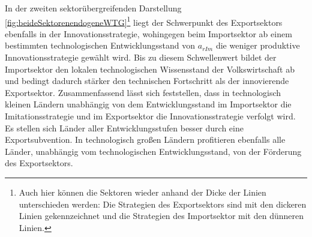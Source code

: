 In der zweiten sektorübergreifenden Darstellung \ref{fig:beideSektorenendogeneWTG}\footnote{Auch hier können die Sektoren wieder anhand der Dicke der Linien unterschieden werden: Die Strategien des Exportsektors sind mit den dickeren Linien gekennzeichnet und die Strategien des Importsektor mit den dünneren Linien.} liegt der Schwerpunkt des Exportsektors ebenfalls in der Innovationsstrategie, wohingegen beim Importsektor ab einem bestimmten technologischen Entwicklungsstand von $a_{rIm}$ die weniger produktive Innovationsstrategie gewählt wird. Bis zu diesem Schwellenwert bildet der Importsektor den lokalen technologischen Wissensstand der Volkswirtschaft ab und bedingt dadurch stärker den technischen Fortschritt als der innovierende Exportsektor.\newline 
Zusammenfassend lässt sich feststellen, dass in technologisch kleinen Ländern unabhängig von dem Entwicklungsstand im Importsektor die Imitationsstrategie und im Exportsektor die Innovationsstrategie verfolgt wird. Es stellen sich Länder aller Entwicklungsstufen besser durch eine Exportsubvention. In technologisch gro{\ss}en Ländern profitieren ebenfalls alle Länder, unabhängig vom technologischen Entwicklungsstand, von der Förderung des Exportsektors. 


